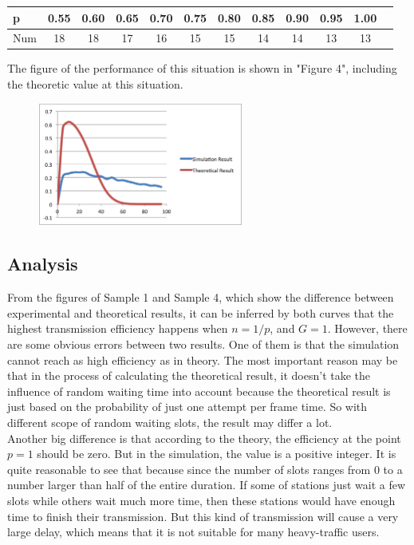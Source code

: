 \documentclass[11pt,a4paper]{report}
\begin{document}
\begin{table}[htbp]
\begin{tabular}{lccccccccccc}
\toprule
p & 0.55 & 0.60 & 0.65  & 0.70 & 0.75 & 0.80 & 0.85 & 0.90 & 0.95 & 1.00 \\
\midrule
Num & 18 & 18 & 17 & 16 & 15 & 15 & 14 & 14 & 13 & 13 \\
\bottomrule
\end{tabular}
\end{table}

The figure of the performance of this situation is shown in "Figure 4", including the theoretic value at this situation.
\begin{figure}
\centering
\includegraphics[width=0.6\textwidth]{4_5.eps}
\caption{}
\end{figure}

\subsection*{Analysis}
From the figures of Sample 1 and Sample 4, which show the difference between experimental and theoretical results, it can be inferred by both curves that the highest transmission efficiency happens when \(n = 1/p\), and \(G = 1\). However, there are some obvious errors between two results. One of them is that the simulation cannot reach as high efficiency as in theory. The most important reason may be that in the process of calculating the theoretical result, it doesn’t take the influence of random waiting time into account because the theoretical result is just based on the probability of just one attempt per frame time. So with different scope of random waiting slots, the result may differ a lot. \\ 

Another big difference is that according to the theory, the efficiency at the point \(p = 1\) should be zero. But in the simulation, the value is a positive integer. It is quite reasonable to see that because since the number of slots ranges from 0 to a number larger than half of the entire duration. If some of stations just wait a few slots while others wait much more time, then these stations would have enough time to finish their transmission. But this kind of transmission will cause a very large delay, which means that it is not suitable for many heavy-traffic users. \\
\end{document}
